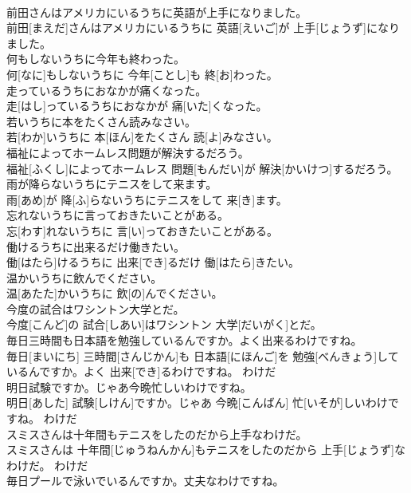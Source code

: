 \documentclass[8pt]{extreport}
\begin{document}
\begin{CJK}{UTF8}{min}
\\	前田さんはアメリカにいるうちに英語が上手になりました。	
\\	前田[まえだ]さんはアメリカにいるうちに 英語[えいご]が 上手[じょうず]になりました。	
\\	何もしないうちに今年も終わった。	
\\	何[なに]もしないうちに 今年[ことし]も 終[お]わった。	
\\	走っているうちにおなかが痛くなった。	
\\	走[はし]っているうちにおなかが 痛[いた]くなった。	
\\	若いうちに本をたくさん読みなさい。	
\\	若[わか]いうちに 本[ほん]をたくさん 読[よ]みなさい。	
\\	福祉によってホームレス問題が解決するだろう。	
\\	福祉[ふくし]によってホームレス 問題[もんだい]が 解決[かいけつ]するだろう。	
\\	雨が降らないうちにテニスをして来ます。	
\\	雨[あめ]が 降[ふ]らないうちにテニスをして 来[き]ます。	
\\	忘れないうちに言っておきたいことがある。	
\\	忘[わす]れないうちに 言[い]っておきたいことがある。	
\\	働けるうちに出来るだけ働きたい。	
\\	働[はたら]けるうちに 出来[でき]るだけ 働[はたら]きたい。	
\\	温かいうちに飲んでください。	
\\	温[あたた]かいうちに 飲[の]んでください。	
\\	今度の試合はワシントン大学とだ。	
\\	今度[こんど]の 試合[しあい]はワシントン 大学[だいがく]とだ。	
\\	毎日三時間も日本語を勉強しているんですか。よく出来るわけですね。	
\\	毎日[まいにち] 三時間[さんじかん]も 日本語[にほんご]を 勉強[べんきょう]しているんですか。よく 出来[でき]るわけですね。	わけだ 
\\	明日試験ですか。じゃあ今晩忙しいわけですね。	
\\	明日[あした] 試験[しけん]ですか。じゃあ 今晩[こんばん] 忙[いそが]しいわけですね。	わけだ 
\\	スミスさんは十年間もテニスをしたのだから上手なわけだ。	
\\	スミスさんは 十年間[じゅうねんかん]もテニスをしたのだから 上手[じょうず]なわけだ。	わけだ 
\\	毎日プールで泳いでいるんですか。丈夫なわけですね。	

\end{CJK}
\end{document}
